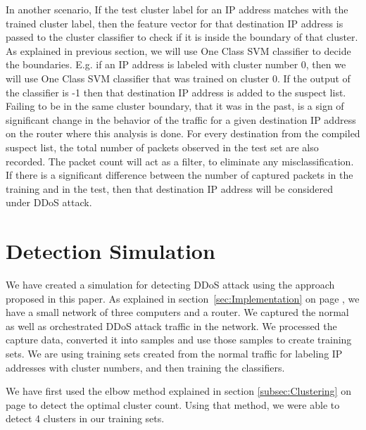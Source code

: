 \documentclass[12pt,oneside,a4paper]{article}
\begin{document}
In another scenario, If the test cluster label for an IP address matches with the trained cluster label, then the feature vector for that destination IP address is passed to the cluster classifier to check if it is inside the boundary of that cluster. As explained in previous section, we will use One Class SVM classifier to decide the boundaries. E.g. if an IP address is labeled with cluster number 0, then we will use One Class SVM classifier that was trained on cluster 0. If the output of the classifier is -1 then that destination IP address is added to the suspect list. Failing to be in the same cluster boundary, that it was in the past, is a sign of significant change in the behavior of the traffic for a given destination IP address on the router where this analysis is done. For every destination from the compiled suspect list, the total number of packets observed in the test set are also recorded. The packet count will act as a filter, to eliminate any misclassification. If there is a significant difference between the number of captured packets in the training and in the test, then that destination IP address will be considered under DDoS attack.

\section{Detection Simulation}

We have created a simulation for detecting DDoS attack using the approach proposed in this paper. As explained in section~\ref{sec:Implementation} on page \pageref{sec:Implementation}, we have a small network of three computers and a router. We captured the normal as well as orchestrated DDoS attack traffic in the network. We processed the capture data, converted it into samples and use those samples to create training sets. We are using training sets created from the normal traffic for labeling IP addresses with cluster numbers, and then training the classifiers.

We have first used the elbow method explained in section \ref{subsec:Clustering} on page \pageref{subsec:Clustering} to detect the optimal cluster count. Using that method, we were able to detect 4 clusters in our training sets.
\end{document}
